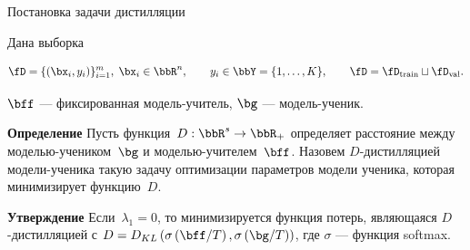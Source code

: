 \documentclass[12pt, aspectratio=169]{beamer}
\begin{document}
\begin{frame}{Постановка задачи дистилляции}
\begin{block}{Дана выборка}
\vspace{-0.5 cm}

$$\fD = \{(\bx_i, y_i)\}_{i=1}^{m},\; \bx_i \in \bbR^n,\qquad y_i \in \bbY = \{1, \dots, K\},\qquad \fD = \fD_\text{train} \sqcup \fD_\text{val}.$$
\end{block}

\vspace{-0.3 cm}
$\bff$ --- фиксированная модель-учитель, $\bg$ --- модель-ученик.

\vspace{0.5 cm} 
\textbf{Определение}
Пусть функция~$D: \bbR^s \to \bbR_{+}$ определяет расстояние между моделью-учеником~$\bg$ и моделью-учителем~$\bff$. Назовем $D$-дистилляцией модели-ученика такую задачу оптимизации параметров модели ученика, которая минимизирует функцию~$D$.

\vspace{0.5 cm}
\fontsize{11}{5}\selectfont

\textbf{Утверждение}
Если~$\lambda_1 = 0$, то минимизируется функция потерь, являющаяся $D$-дистилляцией с $D = D_{KL}\left(\sigma\left(\bff/T\right), \sigma\left(\bg/T\right)\right)$, где $\sigma$ --- функция softmax.

\end{frame}
\end{document}
